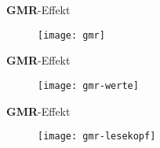 \begin{frame}{\textbf{G}\textbf{M}\textbf{R}-Effekt}{}
	\begin{figure}[H]
		\begin{center}
			\texttt{[image: gmr]}
		\end{center}
	\end{figure}
\end{frame}


\begin{frame}{\textbf{G}\textbf{M}\textbf{R}-Effekt}{}
	\begin{figure}[H]
		\begin{center}
			\texttt{[image: gmr-werte]}
		\end{center}
	\end{figure}
\end{frame}


\begin{frame}{\textbf{G}\textbf{M}\textbf{R}-Effekt}{}
	\begin{figure}[H]
		\begin{center}
			\texttt{[image: gmr-lesekopf]}
		\end{center}
	\end{figure}
	\gmrurl
\end{frame}




